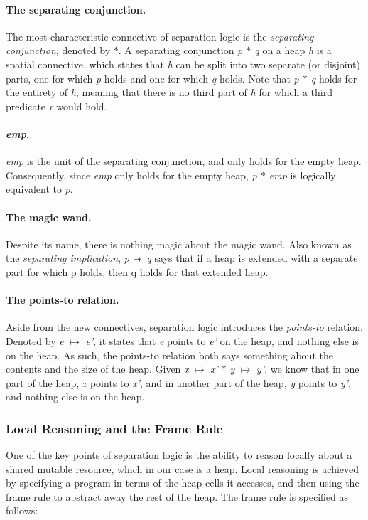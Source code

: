 \paragraph{The separating conjunction.}
The most characteristic connective of separation logic is the {\it separating conjunction}, denoted by {\it $\ast$}. A separating conjunction {\it p $\ast$ q} on a heap {\it h} is a spatial connective, which states that {\it h} can be split into two separate (or disjoint) parts, one for which {\it p} holds and one for which {\it q} holds. Note that {\it p $\ast$ q} holds for the entirety of {\it h}, meaning that there is no third part of {\it h} for which a third predicate {\it r} would hold.

\paragraph{{\it emp}.}
{\it emp} is the unit of the separating conjunction, and only holds for the empty heap. Consequently, since {\it emp} only holds for the empty heap, {\it p $\ast$ emp} is logically equivalent to {\it p}.

\paragraph{The magic wand.}
Despite its name, there is nothing magic about the magic wand. Also known as the {\it separating implication}, {\it p $\wand$ q} says that if a heap is extended with a separate part for which p holds, then q holds for that extended heap.

\paragraph{The points-to relation.}
Aside from the new connectives, separation logic introduces the {\it points-to} relation. Denoted by {\it e} $\mapsto$ {\it e'}, it states that {\it e} points to {\it e'} on the heap, and nothing else is on the heap. As such, the points-to relation both says something about the contents and the size of the heap. Given {\it x} $\mapsto$ {\it x'} $\ast$ {\it y} $\mapsto$ {\it y'}, we know that in one part of the heap, {\it x} points to {\it x'}, and in another part of the heap, {\it y} points to {\it y'}, and nothing else is on the heap.

\subsubsection{Local Reasoning and the Frame Rule}
One of the key points of separation logic is the ability to reason locally about a shared mutable resource, which in our case is a heap. Local reasoning is achieved by specifying a program in terms of the heap cells  it accesses, and then using the frame rule to abstract away the rest of the heap. The frame rule is specified as follows:

